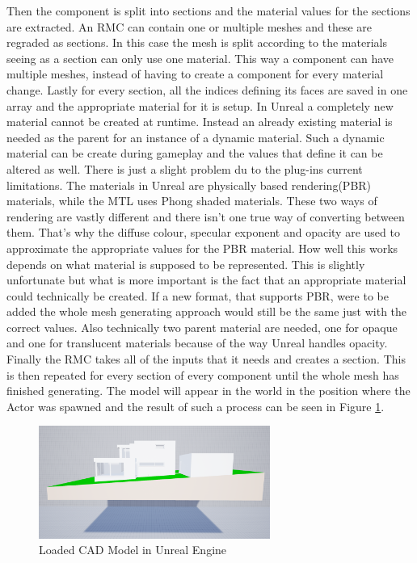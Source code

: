 Then the component is split into sections and the material values for the sections are extracted. An RMC can contain one or multiple meshes and these are regraded as sections. In this case the mesh is split according to the materials seeing as a section can only use one material. This way a component can have multiple meshes, instead of having to create a component for every material change. Lastly for every section, all the indices defining its faces are saved in one array and the appropriate material for it is setup. In Unreal a completely new material cannot be created at runtime. Instead an already existing material is needed as the parent for an instance of a dynamic material. Such a dynamic material can be create during gameplay and the values that define it can be altered as well. There is just a slight problem du to the plug-ins current limitations. The materials in Unreal are physically based rendering(PBR) materials, while the MTL uses Phong shaded materials. These two ways of rendering are vastly different and there isn't one true way of converting between them. That's why the diffuse colour, specular exponent and opacity are used to approximate the appropriate values for the PBR material. How well this works depends on what material is supposed to be represented. This is slightly unfortunate but what is more important is the fact that an appropriate material could technically be created. If a new format, that supports PBR, were to be added the whole mesh generating approach would still be the same just with the correct values. Also technically two parent material are needed, one for opaque and one for translucent materials because of the way Unreal handles opacity.\\
Finally the RMC takes all of the inputs that it needs and creates a section. This is then repeated for every section of every component until the whole mesh has finished generating. The model will appear in the world in the position where the Actor was spawned and the result of such a process can be seen in Figure \ref{fig:LoadedModel}.

\begin{figure}[htpb]
	\centering
	\includegraphics[width=0.675\textwidth]{fig/LoadedModel2.png}
	\caption[Loaded CAD Model in Unreal Engine]{Loaded CAD Model in Unreal Engine\protect}
	\label{fig:LoadedModel}
\end{figure}

